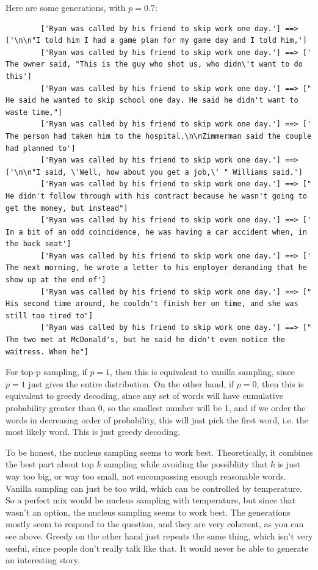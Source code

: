 \documentclass[12pt]{article}
\theoremstyle{definitionstyle}
\begin{document}
    Here are some generations, with $p = 0.7$:
    \begin{lstlisting}
        ['Ryan was called by his friend to skip work one day.'] ==> ['\n\n"I told him I had a game plan for my game day and I told him,']
        ['Ryan was called by his friend to skip work one day.'] ==> [' The owner said, "This is the guy who shot us, who didn\'t want to do this']
        ['Ryan was called by his friend to skip work one day.'] ==> [" He said he wanted to skip school one day. He said he didn't want to waste time,"]
        ['Ryan was called by his friend to skip work one day.'] ==> [' The person had taken him to the hospital.\n\nZimmerman said the couple had planned to']
        ['Ryan was called by his friend to skip work one day.'] ==> ['\n\n"I said, \'Well, how about you get a job,\' " Williams said.']
        ['Ryan was called by his friend to skip work one day.'] ==> [" He didn't follow through with his contract because he wasn't going to get the money, but instead"]
        ['Ryan was called by his friend to skip work one day.'] ==> [' In a bit of an odd coincidence, he was having a car accident when, in the back seat']
        ['Ryan was called by his friend to skip work one day.'] ==> [' The next morning, he wrote a letter to his employer demanding that he show up at the end of']
        ['Ryan was called by his friend to skip work one day.'] ==> [" His second time around, he couldn't finish her on time, and she was still too tired to"]
        ['Ryan was called by his friend to skip work one day.'] ==> [" The two met at McDonald's, but he said he didn't even notice the waitress. When he"]
    \end{lstlisting}
    For top-p sampling, if $p=1$, then this is equivalent to vanilla sampling, since $p=1$ just gives the entire distribution. On the other hand, if $p = 0$, then this is equivalent to greedy decoding, since any set of words will have cumulative probability greater than $0$, so the smallest number will be 1, and if we order the words in decreasing order of probability, this will just pick the first word, i.e. the most likely word. This is just greedy decoding.

    To be honest, the nucleus sampling seems to work best. Theoretically, it combines the best part about top $k$ sampling while avoiding the possibliity that $k$ is just way too big, or way too small, not encompassing enough reasonable words. Vanilla sampling can just be too wild, which can be controlled by temperature. So a perfect mix would be nucleus sampling with temperature, but since that wasn't an option, the nucleus sampling seems to work best. The generations mostly seem to respond to the question, and they are very coherent, as you can see above. Greedy on the other hand just repeats the same thing, which isn't very useful, since people don't really talk like that. It would never be able to generate an interesting story. 
\end{document}
